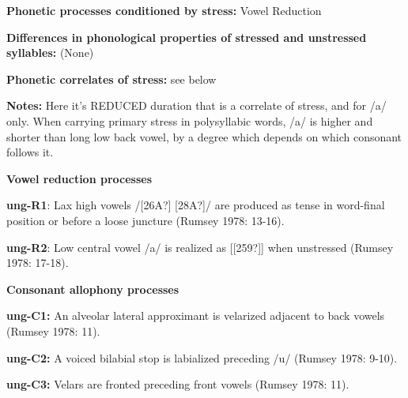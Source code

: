 \begin{styleBody}
\textbf{Phonetic processes conditioned by stress:} Vowel Reduction
\end{styleBody}

\begin{styleBody}
\textbf{Differences in phonological properties of stressed and unstressed syllables:} (None)
\end{styleBody}

\begin{styleBody}
\textbf{Phonetic correlates of stress: }see below
\end{styleBody}

\begin{styleBody}
\textbf{Notes:} Here it’s REDUCED duration that is a correlate of stress, and for /a/ only. When carrying primary stress in polysyllabic words, /a/ is higher and shorter than long low back vowel, by a degree which depends on which consonant follows it.
\end{styleBody}

\begin{styleBody}
\textbf{Vowel reduction processes}
\end{styleBody}

\begin{styleBody}
\textbf{ung-R1}: Lax high vowels /[26A?] [28A?]/ are produced as tense in word-final position or before a loose juncture (Rumsey 1978: 13-16).
\end{styleBody}

\begin{styleBody}
\textbf{ung-R2}: Low central vowel /a/ is realized as [[259?]] when unstressed (Rumsey 1978: 17-18).
\end{styleBody}

\begin{styleBody}
\textbf{Consonant allophony processes}
\end{styleBody}

\begin{styleBody}
\textbf{ung-C1: }An alveolar lateral approximant is velarized adjacent to back vowels (Rumsey 1978: 11).
\end{styleBody}

\begin{styleBody}
\textbf{ung-C2: }A voiced bilabial stop is labialized preceding /u/ (Rumsey 1978: 9-10).
\end{styleBody}

\begin{styleBody}
\textbf{ung-C3: }Velars are fronted preceding front vowels (Rumsey 1978: 11).
\end{styleBody}

